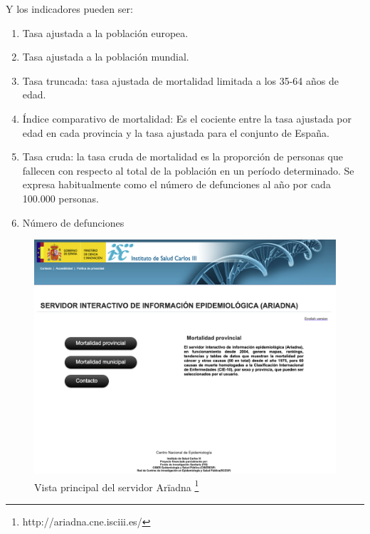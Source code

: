Y los indicadores pueden ser:
\begin{enumerate}
  \item Tasa ajustada a la población europea.
  \item Tasa ajustada a la población mundial.
  \item Tasa truncada: tasa ajustada de mortalidad limitada a los 35-64 años de edad.
  \item Índice comparativo de mortalidad: Es el cociente entre la tasa ajustada por edad en cada provincia y la tasa
  ajustada para el conjunto de España.
  \item Tasa cruda: la tasa cruda de mortalidad es la proporción de personas que fallecen con respecto al total
  de la población en un período determinado. Se expresa habitualmente como el número de defunciones al año
  por cada 100.000 personas.
  \item Número de defunciones
\end{enumerate}
\FloatBarrier
\begin{figure}[]
	\centering
	\includegraphics[scale=0.5]{doc/logos/imgs/ariadna1.png}
	\caption{ Vista principal del servidor Arïadna \footnote{http://ariadna.cne.isciii.es/} }
    \label{fig:worst_f_value}
\end{figure}


